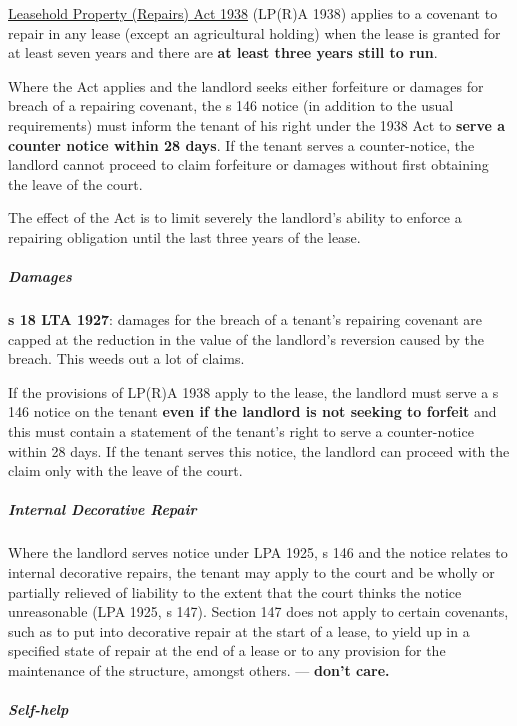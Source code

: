 \documentclass[
]{article}
\begin{document}
\href{https://www.legislation.gov.uk/ukpga/Geo6/1-2/34/contents}{Leasehold
Property (Repairs) Act 1938} (LP(R)A 1938) applies to a covenant to
repair in any lease (except an agricultural holding) when the lease is
granted for at least seven years and there are \textbf{at least three
years still to run}.

Where the Act applies and the landlord seeks either forfeiture or
damages for breach of a repairing covenant, the s 146 notice (in
addition to the usual requirements) must inform the tenant of his right
under the 1938 Act to \textbf{serve a counter notice within 28 days}. If
the tenant serves a counter-notice, the landlord cannot proceed to claim
forfeiture or damages without first obtaining the leave of the court.

The effect of the Act is to limit severely the landlord's ability to
enforce a repairing obligation until the last three years of the lease.

\hypertarget{damages}{%
\subparagraph{Damages}\label{damages}}

\textbf{s 18 LTA 1927}: damages for the breach of a tenant's repairing
covenant are capped at the reduction in the value of the landlord's
reversion caused by the breach. This weeds out a lot of claims.

If the provisions of LP(R)A 1938 apply to the lease, the landlord must
serve a s 146 notice on the tenant \textbf{even if the landlord is not
seeking to forfeit} and this must contain a statement of the tenant's
right to serve a counter-notice within 28 days. If the tenant serves
this notice, the landlord can proceed with the claim only with the leave
of the court.

\hypertarget{internal-decorative-repair}{%
\subparagraph{Internal Decorative
Repair}\label{internal-decorative-repair}}

Where the landlord serves notice under LPA 1925, s 146 and the notice
relates to internal decorative repairs, the tenant may apply to the
court and be wholly or partially relieved of liability to the extent
that the court thinks the notice unreasonable (LPA 1925, s 147). Section
147 does not apply to certain covenants, such as to put into decorative
repair at the start of a lease, to yield up in a specified state of
repair at the end of a lease or to any provision for the maintenance of
the structure, amongst others. --- \textbf{don't care.}

\hypertarget{self-help}{%
\subparagraph{Self-help}\label{self-help}}
\end{document}
